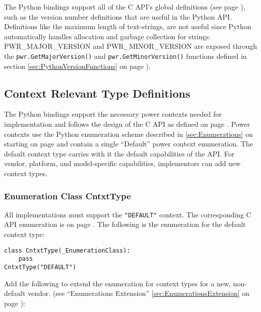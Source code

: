 The Python bindings support all of the C API's global definitions (see page
\pageref{sec:GlobalTypes}), such as the version number definitions that are
useful in the Python API. Definitions like the maximum length of text-strings,
are not useful since Python automatically handles allocation and garbage
collection for strings. PWR_MAJOR_VERSION and PWR_MINOR_VERSION are exposed
through the \texttt{pwr.GetMajorVersion()} and \texttt{pwr.GetMinorVersion()}
functions defined in section \ref{sec:PythonVersionFunctions} on page
\pageref{sec:PythonVersionFunctions}).

\subsection{Context Relevant Type Definitions}
\label{sec:PythonContextReleventTypeDefinitions}

The Python bindings support the necessary power contexts needed for 
implementation and follows the design of the C API as defined on page
\pageref{sec:ContextTypeDefinitions}. Power contexts use the Python
enumeration scheme described in \ref{sec:Enumerations} on starting on page
\pageref{sec:Enumerations} and contain a single ``Default'' power context
enumeration. The default context type carries with it the default capabilities
of the API. For vendor, platform, and model-specific capabilities, implementors can add new context types.

\subsubsection{Enumeration Class CntxtType}\label{class:CntxtType}

All implementations must support the \texttt{"DEFAULT"} context. The corresponding C
API enumeration is on page \pageref{type:CntxtType}. The following is the enumeration
for the default context type:

\begin{center}\begin{minipage}{.95\linewidth}\begin{lstlisting}
class CntxtType(_EnumerationClass):
    pass
CntxtType("DEFAULT")
\end{lstlisting}\end{minipage}\end{center}

Add the following to extend the enumeration for context types for a new, non-default vendor.
(see ``Enumerations Extension'' \ref{sec:EnumerationsExtension} on page
\pageref{sec:EnumerationsExtension}):

